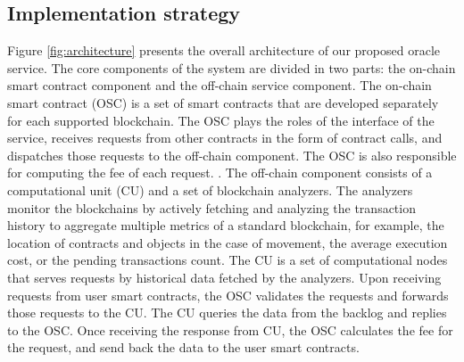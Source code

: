\subsection{Implementation strategy}
\label{sec:strategy}


Figure \ref{fig:architecture} presents the overall architecture of our proposed
oracle service. The core components of the system are divided in two parts: the
on-chain smart contract component and the off-chain service component. The
on-chain smart contract (OSC) is a set of smart contracts that are developed
separately for each supported blockchain. The OSC plays the roles of the
interface of the service, receives requests from other contracts in the form of
contract calls, and dispatches those requests to the off-chain component. The
OSC is also responsible for computing the fee of each request. . The off-chain component consists of a computational unit (CU)
and a set of blockchain analyzers. The analyzers monitor the blockchains by
actively fetching and analyzing the transaction history to aggregate multiple
metrics of a standard blockchain, for example, the location of contracts and
objects in the case of movement, the average execution cost, or the pending
transactions count. The CU is a set of computational nodes that serves requests
by historical data fetched by the analyzers. Upon receiving requests from user
smart contracts, the OSC validates the requests and forwards those requests to
the CU. The CU queries the data from the backlog and replies to the OSC. Once
receiving the response from CU, the OSC calculates the fee for the request, and
send back the data to the user smart contracts.

